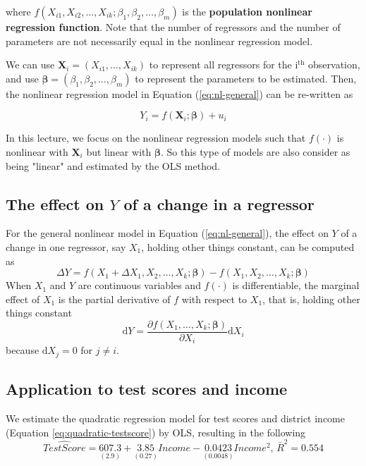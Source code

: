 \documentclass[a4paper,11pt]{article}
\begin{document}
where \(f(X_{i1}, X_{i2}, \ldots, X_{ik}; \beta_1, \beta_2, \ldots,
\beta_m)\) is the \textbf{population nonlinear regression function}. Note that
the number of regressors and the number of parameters are not
necessarily equal in the nonlinear regression model.

We can use \(\mathbf{X}_i = (X_{i1}, \ldots, X_{ik})\) to represent all
regressors for the i\(^{\text{th}}\) observation, and use
\(\boldsymbol{\beta}=(\beta_1, \beta_2, \ldots, \beta_m)\) to represent
the parameters to be estimated. Then, the nonlinear regression model
in Equation (\ref{eq:nl-general}) can be re-written as

\begin{equation}
\label{eq:nl-general-mat}
Y_i = f(\mathbf{X}_i; \boldsymbol{\beta}) + u_i
\end{equation}

In this lecture, we focus on the nonlinear regression models
such that \(f(\cdot)\) is nonlinear with \(\mathbf{X}_i\) but linear with
\(\boldsymbol{\beta}\). So this type of models are also consider as
being "linear" and estimated by the OLS method.


\subsection{The effect on \(Y\) of a change in a regressor}
\label{sec:org737a21b}

For the general nonlinear model in Equation (\ref{eq:nl-general}), the
effect on \(Y\) of a change in one regressor, say \(X_1\), holding other
things constant, can be computed as
\begin{equation}
\label{eq:nl-gen-effect}
\Delta Y = f(X_1 + \Delta X_1, X_2, \ldots, X_k; \boldsymbol{\beta}) - f(X_1, X_2, \ldots, X_k; \boldsymbol{\beta})
\end{equation}
When \(X_1\) and \(Y\) are continuous variables and \(f(\cdot)\) is
differentiable, the marginal effect of \(X_1\) is the partial derivative
of \(f\) with respect to \(X_1\), that is, holding other things constant
\[ \mathrm{d}Y = \frac{\partial f(X_1, \ldots, X_k;
\boldsymbol{\beta})}{\partial X_i} \mathrm{d} X_i \]
because \(\mathrm{d}X_j = 0\) for \(j \neq i\).


\subsection{Application to test scores and income}
\label{sec:org3866b31}

We estimate the quadratic regression model for test scores and
district income (Equation \ref{eq:quadratic-testscore}) by OLS,
resulting in the following
\begin{equation}
\label{eq:tsr-income2}
\widehat{TestScore} = \underset{\displaystyle (2.9)}{607.3} +
\underset{\displaystyle (0.27)}{3.85}Income - \underset{\displaystyle (0.0048)}{0.0423}Income^2,\, \bar{R}^2 = 0.554
\end{equation}
\end{document}
